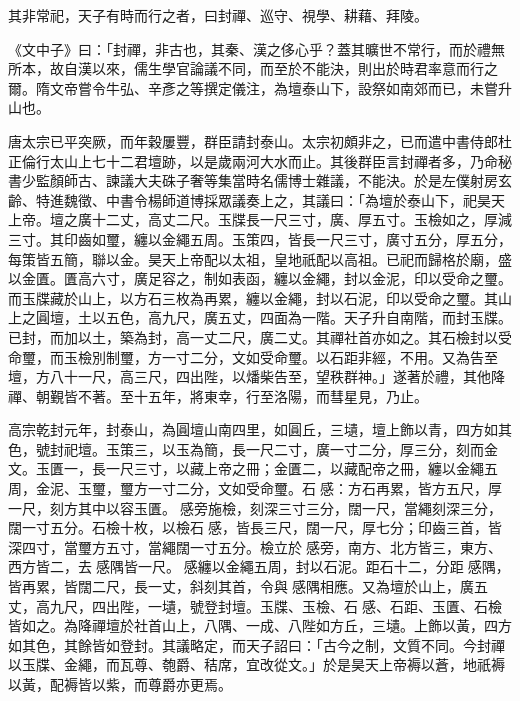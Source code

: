 
\begin{pinyinscope}

 其非常祀，天子有時而行之者，曰封禪、巡守、視學、耕藉、拜陵。



 《文中子》曰：「封禪，非古也，其秦、漢之侈心乎？蓋其曠世不常行，而於禮無所本，故自漢以來，儒生學官論議不同，而至於不能決，則出於時君率意而行之爾。隋文帝嘗令牛弘、辛彥之等撰定儀注，為壇泰山下，設祭如南郊而已，未嘗升山也。



 唐太宗已平突厥，而年穀屢豐，群臣請封泰山。太宗初頗非之，已而遣中書侍郎杜正倫行太山上七十二君壇跡，以是歲兩河大水而止。其後群臣言封禪者多，乃命秘書少監顏師古、諫議大夫硃子奢等集當時名儒博士雜議，不能決。於是左僕射房玄齡、特進魏徵、中書令楊師道博採眾議奏上之，其議曰：「為壇於泰山下，祀昊天上帝。壇之廣十二丈，高丈二尺。玉牒長一尺三寸，廣、厚五寸。玉檢如之，厚減三寸。其印齒如璽，纏以金繩五周。玉策四，皆長一尺三寸，廣寸五分，厚五分，每策皆五簡，聯以金。昊天上帝配以太祖，皇地祇配以高祖。已祀而歸格於廟，盛以金匱。匱高六寸，廣足容之，制如表函，纏以金繩，封以金泥，印以受命之璽。而玉牒藏於山上，以方石三枚為再累，纏以金繩，封以石泥，印以受命之璽。其山上之圓壇，土以五色，高九尺，廣五丈，四面為一階。天子升自南階，而封玉牒。已封，而加以土，築為封，高一丈二尺，廣二丈。其禪社首亦如之。其石檢封以受命璽，而玉檢別制璽，方一寸二分，文如受命璽。以石距非經，不用。又為告至壇，方八十一尺，高三尺，四出陛，以燔柴告至，望秩群神。」遂著於禮，其他降禪、朝覲皆不著。至十五年，將東幸，行至洛陽，而彗星見，乃止。



 高宗乾封元年，封泰山，為圓壇山南四里，如圓丘，三壝，壇上飾以青，四方如其色，號封祀壇。玉策三，以玉為簡，長一尺二寸，廣一寸二分，厚三分，刻而金文。玉匱一，長一尺三寸，以藏上帝之冊；金匱二，以藏配帝之冊，纏以金繩五周，金泥、玉璽，璽方一寸二分，文如受命璽。石感：方石再累，皆方五尺，厚一尺，刻方其中以容玉匱。感旁施檢，刻深三寸三分，闊一尺，當繩刻深三分，闊一寸五分。石檢十枚，以檢石感，皆長三尺，闊一尺，厚七分；印齒三首，皆深四寸，當璽方五寸，當繩闊一寸五分。檢立於感旁，南方、北方皆三，東方、西方皆二，去感隅皆一尺。感纏以金繩五周，封以石泥。距石十二，分距感隅，皆再累，皆闊二尺，長一丈，斜刻其首，令與感隅相應。又為壇於山上，廣五丈，高九尺，四出陛，一壝，號登封壇。玉牒、玉檢、石感、石距、玉匱、石檢皆如之。為降禪壇於社首山上，八隅、一成、八陛如方丘，三壝。上飾以黃，四方如其色，其餘皆如登封。其議略定，而天子詔曰：「古今之制，文質不同。今封禪以玉牒、金繩，而瓦尊、匏爵、秸席，宜改從文。」於是昊天上帝褥以蒼，地祇褥以黃，配褥皆以紫，而尊爵亦更焉。




\end{pinyinscope}
